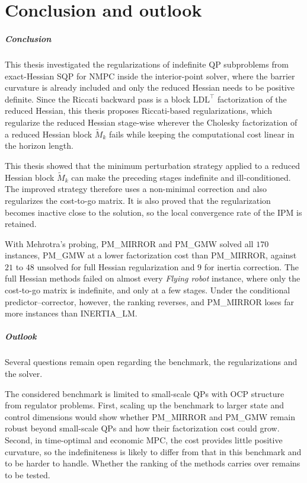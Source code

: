 \documentclass[class=scrbook, crop=false]{standalone}
\begin{document}
\chapter{Conclusion and outlook} %
\label{Chapter::Conclusion}

\paragraph{Conclusion}
This thesis investigated the regularizations of indefinite \gls{QP} subproblems
from exact-Hessian \gls{SQP} for \gls{NMPC} inside the interior-point solver,
where the barrier curvature is already included and only the reduced Hessian needs to be positive definite.
Since the Riccati backward pass is a block $\mathrm{LD}\mathrm{L}^\top$ factorization of the reduced Hessian,
this thesis proposes Riccati-based regularizations, which regularize the reduced Hessian stage-wise
wherever the Cholesky factorization of a reduced Hessian block $\tilde{M}_k$ fails while keeping the computational cost linear in the horizon length.

This thesis showed that the minimum perturbation strategy applied to a reduced Hessian block $\tilde{M}_k$
can make the preceding stages indefinite and ill-conditioned.
The improved strategy therefore uses a non-minimal correction and also regularizes the cost-to-go matrix.
It is also proved that the regularization becomes inactive close to the solution, so the local convergence rate of the \gls{IPM} is retained.

With Mehrotra's probing, \textsf{PM\_MIRROR} and \textsf{PM\_GMW} solved all $170$ instances,
\textsf{PM\_GMW} at a lower factorization cost than \textsf{PM\_MIRROR},
against $21$ to $48$ unsolved for full Hessian regularization and $9$ for inertia correction.
The full Hessian methods failed on almost every \textsl{Flying robot} instance,
where only the cost-to-go matrix is indefinite, and only at a few stages.
Under the conditional predictor--corrector, however, the ranking reverses,
and \textsf{PM\_MIRROR} loses far more instances than \textsf{INERTIA\_LM}.

\paragraph{Outlook}
Several questions remain open regarding the benchmark, the regularizations and the solver.

The considered benchmark is limited to small-scale \glspl{QP} with \gls{OCP} structure from regulator problems.
First, scaling up the benchmark to larger state and control dimensions
would show whether \textsf{PM\_MIRROR} and \textsf{PM\_GMW} remain robust beyond small-scale \glspl{QP}
and how their factorization cost could grow.
Second, in time-optimal and economic MPC,
the cost provides little positive curvature, so the indefiniteness is likely to differ from that in this benchmark and to be harder to handle.
Whether the ranking of the methods carries over remains to be tested.
\end{document}
